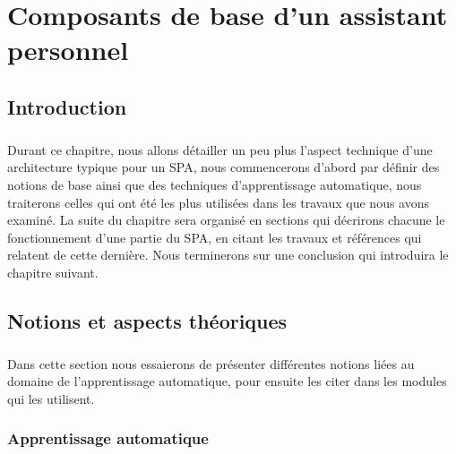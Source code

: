 \chapter{Composants de base d'un assistant personnel}

\section{Introduction}
	\paragraph{}
	Durant ce chapitre, nous allons détailler un peu plus l'aspect technique d'une architecture typique pour un SPA, nous commencerons d'abord par définir des notions de base ainsi que des techniques d'apprentissage automatique, nous traiterons celles qui ont été les plus utilisées dans les travaux que nous avons examiné. La suite du chapitre sera organisé en sections qui décrirons chacune le fonctionnement d'une partie du SPA, en citant les travaux et références qui relatent de cette dernière. Nous terminerons sur une conclusion qui introduira le chapitre suivant.
\section{Notions et aspects théoriques}
	\paragraph{}
	Dans cette section nous essaierons de présenter différentes notions liées au domaine de l'apprentissage automatique, pour ensuite les citer dans les modules qui les utilisent. 
	\subsection{Apprentissage automatique}
